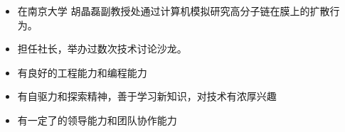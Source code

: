 \documentclass[zh]{resume}
\begin{document}
\begin{itemize}
  \item 在南京大学
        {胡晶磊副教授}处通过计算机模拟研究高分子链在膜上的扩散行为。%
\end{itemize}


\begin{itemize}
  \item 担任社长，举办过数次技术讨论沙龙。
\end{itemize}

\begin{itemize}
  \item 有良好的工程能力和编程能力
  \item 有自驱力和探索精神，善于学习新知识，对技术有浓厚兴趣
  \item 有一定了的领导能力和团队协作能力
\end{itemize}
\end{document}
